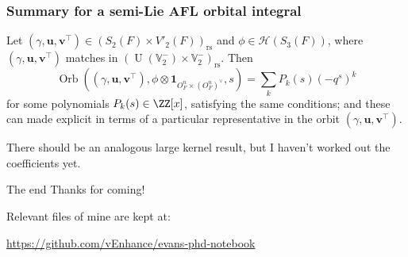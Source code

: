 \documentclass[11pt]{beamer}
\DeclareMathOperator{\Orb}{Orb}
\DeclareMathOperator{\U}{U}
\newcommand{\HH}{\mathcal{H}}
\newcommand{\VV}{\mathbb{V}}
\renewcommand{\OO}{O}
\newcommand{\guv}{{(\gamma, \uu, \vv^\top)}}
\newcommand{\oneV}{\mathbf{1}_{\OO_F^n \times (\OO_F^n)^\vee}}
\newcommand{\rs}{_{\text{rs}}}
\newcommand{\uu}{\mathbf{u}}
\newcommand{\vv}{\mathbf{v}}
\begin{document}
\begin{frame}
  \frametitle{Summary for a semi-Lie AFL orbital integral}
  \begin{theorem}[C.]
    Let $\guv \in (S_2(F) \times V'_2(F))\rs$ and $\phi \in \HH(S_3(F))$,
    where $\guv$ matches in $(\U(\VV_2^-) \times \VV_2^-)\rs$.
    Then
    \[ \Orb(\guv, \phi \otimes \oneV, s) = \sum_k P_k(s) (-q^s)^k \]
    for some polynomials $P_k(s) \in \ZZ[x]$, satisfying the same conditions;
    and these can made explicit in terms of a particular representative in the orbit $\guv$.
  \end{theorem}
  There should be an analogous large kernel result,
  but I haven't worked out the coefficients yet.
\end{frame}

\begin{frame}
  \begin{block}{The end}
    Thanks for coming!
  \end{block}

  Relevant files of mine are kept at:
  \begin{itemize}
    \ii \url{https://github.com/vEnhance/evans-phd-notebook}
  \end{itemize}
\end{frame}
\end{document}
